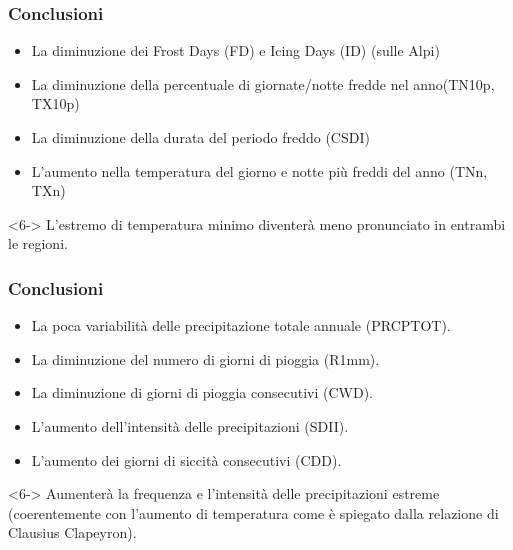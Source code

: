 \begin{frame}[t]
\end{frame} 

\begin{frame}	
    \frametitle{Conclusioni}
    \begin{itemize}	
    \item<1-> La diminuzione dei Frost Days (FD) e Icing Days (ID) (sulle Alpi)
	\item<2-> La diminuzione della percentuale di giornate/notte fredde nel anno(TN10p, TX10p) 
	\item<3-> La diminuzione della durata del periodo freddo (CSDI)
	\item<4-> L'aumento nella temperatura del giorno e notte più freddi del anno (TNn, TXn)
	\end{itemize}

\begin{alertblock}<6->{}
L'estremo di temperatura minimo diventerà meno pronunciato in entrambi le regioni. 
\end{alertblock}	
\end{frame}	

		
\begin{frame}	
    \frametitle{Conclusioni}
    \begin{itemize}	
    \item<1-> La poca variabilità delle precipitazione totale annuale (PRCPTOT).
	\item<2-> La diminuzione del numero di giorni di pioggia (R1mm).  %
	\item<3-> La diminuzione di giorni di pioggia consecutivi (CWD).
	\item<4-> L'aumento dell'intensità delle precipitazioni (SDII). 
	\item<5-> L'aumento dei giorni di siccità consecutivi (CDD).
	\end{itemize}

\begin{alertblock}<6->{}
       \setlength\itemsep{0pt}
	  Aumenterà la frequenza e l'intensità delle precipitazioni estreme (coerentemente con l'aumento di temperatura come è spiegato dalla relazione di Clausius Clapeyron).
\end{alertblock}	
\end{frame}	
	
